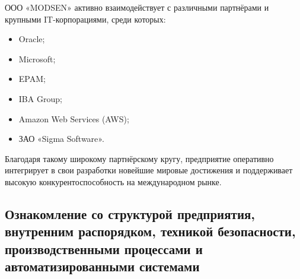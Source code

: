 ООО «MODSEN» активно взаимодействует с различными партнёрами и крупными IT-корпорациями, среди которых:
\begin{itemize}
    \item Oracle;
    \item Microsoft;
    \item EPAM;
    \item IBA Group;
    \item Amazon Web Services (AWS);
    \item ЗАО «Sigma Software».
\end{itemize}
Благодаря такому широкому партнёрскому кругу, предприятие оперативно интегрирует в свои разработки новейшие мировые достижения и поддерживает высокую конкурентоспособность на международном рынке.

\subsection{Ознакомление со структурой предприятия, внутренним распорядком, техникой безопасности, производственными процессами и автоматизированными системами}
\label{subsec:practice:industrial_safety}

